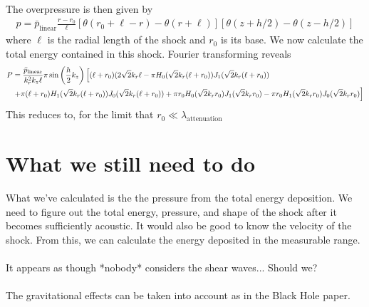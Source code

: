 \documentclass{article}
\newcommand*\te[1]{\text{#1}}
\newcommand*\p[1]{\left(#1\right)}
\newcommand*\ps[1]{\left[#1\right]}
\newcommand*\f[2]{\frac{#1}{#2}}
\begin{document}
The overpressure is then given by
\begin{align}
p=\bar p_{\te{linear}}\f{r-r_0}{\ell}\ps{\theta(r_0+\ell-r)-\theta(r+\ell)}\ps{\theta(z+h/2)-\theta(z-h/2)}
\end{align}
where $\ell$ is the radial length of the shock and $r_0$ is its base. We now calculate the total energy contained in this shock. Fourier transforming reveals
\begin{align}
\notag P&=\f{\bar p_{\te{linear}}}{k_r^2k_z\ell}\pi\sin\p{\f{h}{2}k_z}\ps{(\ell+r_0)(2\sqrt{2} k_r\ell-\pi H_0(\sqrt{2} k_r(\ell+r_0))J_1(\sqrt{2}k_r(\ell+r_0))\right.\\&\left.+\pi(\ell+r_0)H_1(\sqrt{2}k_r(\ell+r_0))J_0(\sqrt{2}k_r(\ell+r_0))+\pi r_0 H_0(\sqrt{2}k_r r_0)J_1(\sqrt{2}k_r r_0)-\pi r_0 H_1(\sqrt{2} k_r r_0)J_0(\sqrt{2}k_r r_0)}
\end{align}
This reduces to, for the limit that $r_0\ll\lambda_{\te{attenuation}}$ 
\pagebreak
\section{What we still need to do}
What we've calculated is the the pressure from the total energy deposition. We need to figure out the total energy, pressure, and shape of the shock after it becomes sufficiently acoustic. It would also be good to know the velocity of the shock. From this, we can calculate the energy deposited in the measurable range.
\\\\
It appears as though *nobody* considers the shear waves... Should we?
\\\\
The gravitational effects can be taken into account as in the Black Hole paper.
\end{document}
